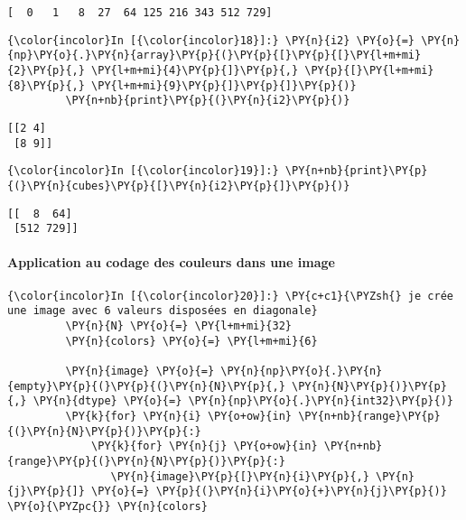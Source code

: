     \begin{Verbatim}[commandchars=\\\{\}]
[  0   1   8  27  64 125 216 343 512 729]

    \end{Verbatim}

    \begin{Verbatim}[commandchars=\\\{\}]
{\color{incolor}In [{\color{incolor}18}]:} \PY{n}{i2} \PY{o}{=} \PY{n}{np}\PY{o}{.}\PY{n}{array}\PY{p}{(}\PY{p}{[}\PY{p}{[}\PY{l+m+mi}{2}\PY{p}{,} \PY{l+m+mi}{4}\PY{p}{]}\PY{p}{,} \PY{p}{[}\PY{l+m+mi}{8}\PY{p}{,} \PY{l+m+mi}{9}\PY{p}{]}\PY{p}{]}\PY{p}{)}
         \PY{n+nb}{print}\PY{p}{(}\PY{n}{i2}\PY{p}{)}
\end{Verbatim}


    \begin{Verbatim}[commandchars=\\\{\}]
[[2 4]
 [8 9]]

    \end{Verbatim}

    \begin{Verbatim}[commandchars=\\\{\}]
{\color{incolor}In [{\color{incolor}19}]:} \PY{n+nb}{print}\PY{p}{(}\PY{n}{cubes}\PY{p}{[}\PY{n}{i2}\PY{p}{]}\PY{p}{)}
\end{Verbatim}


    \begin{Verbatim}[commandchars=\\\{\}]
[[  8  64]
 [512 729]]

    \end{Verbatim}

    \hypertarget{application-au-codage-des-couleurs-dans-une-image}{%
\paragraph{Application au codage des couleurs dans une
image}\label{application-au-codage-des-couleurs-dans-une-image}}

    \begin{Verbatim}[commandchars=\\\{\}]
{\color{incolor}In [{\color{incolor}20}]:} \PY{c+c1}{\PYZsh{} je crée une image avec 6 valeurs disposées en diagonale}
         \PY{n}{N} \PY{o}{=} \PY{l+m+mi}{32}
         \PY{n}{colors} \PY{o}{=} \PY{l+m+mi}{6}
         
         \PY{n}{image} \PY{o}{=} \PY{n}{np}\PY{o}{.}\PY{n}{empty}\PY{p}{(}\PY{p}{(}\PY{n}{N}\PY{p}{,} \PY{n}{N}\PY{p}{)}\PY{p}{,} \PY{n}{dtype} \PY{o}{=} \PY{n}{np}\PY{o}{.}\PY{n}{int32}\PY{p}{)}
         \PY{k}{for} \PY{n}{i} \PY{o+ow}{in} \PY{n+nb}{range}\PY{p}{(}\PY{n}{N}\PY{p}{)}\PY{p}{:}
             \PY{k}{for} \PY{n}{j} \PY{o+ow}{in} \PY{n+nb}{range}\PY{p}{(}\PY{n}{N}\PY{p}{)}\PY{p}{:}
                \PY{n}{image}\PY{p}{[}\PY{n}{i}\PY{p}{,} \PY{n}{j}\PY{p}{]} \PY{o}{=} \PY{p}{(}\PY{n}{i}\PY{o}{+}\PY{n}{j}\PY{p}{)} \PY{o}{\PYZpc{}} \PY{n}{colors}
\end{Verbatim}


